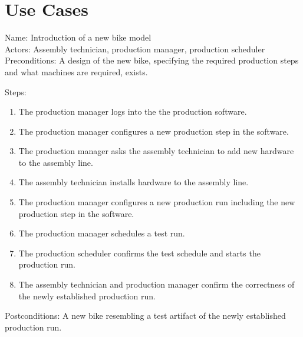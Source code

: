 \documentclass{article}
\title{}
\date{}
\begin{document}
\maketitle

\section{Use Cases}
Name: Introduction of a new bike model \\
Actors: Assembly technician, production manager, production scheduler \\
Preconditions: A design of the new bike, specifying the required production steps and what machines are required, exists.

Steps:
\begin{enumerate}
\item The production manager logs into the the production software.
\item The production manager configures a new production step in the software.

\item The production manager asks the assembly technician to add new hardware to the assembly line.

\item The assembly technician installs hardware to the assembly line.

\item The production manager configures a new production run including the new production step in the software.

\item The production manager schedules a test run.

\item The production scheduler confirms the test schedule and starts the production run.
\item The assembly technician and production manager confirm the correctness of the newly established production run.


\end{enumerate}

Postconditions: A new bike resembling a test artifact of the newly established production run. \\
\end{document}

